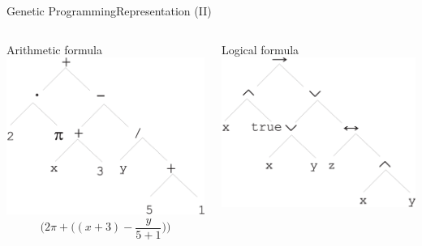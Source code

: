 \documentclass[10pt,compress]{beamer} %
\begin{document}
\begin{frame}[fragile]{Genetic Programming}{Representation (II)}
    \begin{columns}
	   		\begin{center}
	    	Arithmetic formula
			\includegraphics[width=\linewidth]{figs/arithmetictree.eps}\\
			\begin{equation*}
			\bigg( 2\pi + \big((x+3)-\frac{y}{5+1}\big)\bigg)
			\end{equation*}	
			\end{center}
	   		\begin{center}
	    	Logical formula
			\includegraphics[width=\linewidth]{figs/logicaltree.eps}\\

\end{center}
\end{columns}
\end{frame}
\end{document}
